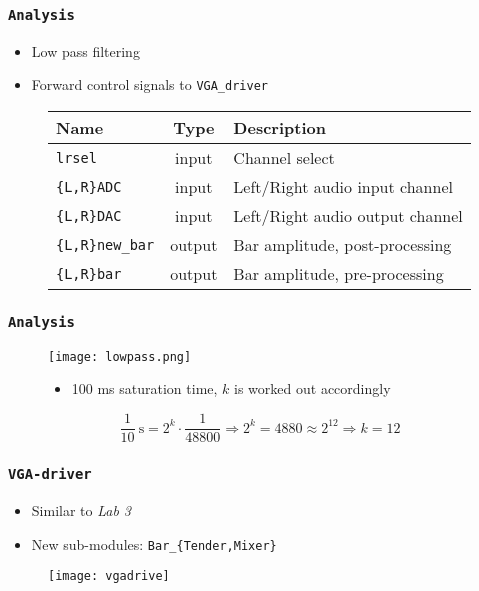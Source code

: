 \begin{frame}
  \frametitle{\texttt{Analysis}}
    \begin{itemize}
      \item Low pass filtering
      \item Forward control signals to \texttt{VGA\_driver}
    \end{itemize}
    \begin{figure}
      \centering
      \begin{tabular}{|l|c|l|}
        \hline
        Name & Type & Description \\    \hline
        \texttt{lrsel} & input & Channel select \\    \hline
        \texttt{\{L,R\}ADC} & input & Left/Right audio input channel \\    \hline
        \texttt{\{L,R\}DAC} & input & Left/Right audio output channel \\    \hline
        \texttt{\{L,R\}new\_bar} & output & Bar amplitude, post-processing\\    \hline
        \texttt{\{L,R\}bar} & output & Bar amplitude, pre-processing\\    \hline
      \end{tabular}
    \end{figure}
\end{frame}

\begin{frame}
  \frametitle{\texttt{Analysis}}
	\begin{figure}
	  \texttt{[image: lowpass.png]}
	  \begin{itemize}
	    \item 100 ms saturation time, $k$ is worked out accordingly
	  \end{itemize}
	  $$\frac{1}{10}\mathrm{\ s} = 2^k\cdot\frac{1}{48800}\Rightarrow 2^k=4880\approx 2^{12}\Rightarrow k = 12$$
	\end{figure}
\end{frame}

\begin{frame}[plain]
  \frametitle{\texttt{VGA-driver}}
    \begin{itemize}
      \item Similar to \emph{Lab 3} 
      \item New sub-modules: \texttt{Bar\_\{Tender,Mixer\}}
    \end{itemize}
    \begin{figure}
      \centering
      \texttt{[image: vgadrive]}
    \end{figure}
\end{frame}

